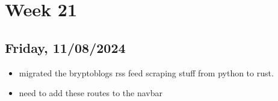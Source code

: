 \newpage
\section{Week 21}

\subsection{Friday, 11/08/2024}
\begin{itemize}
    \item migrated the bryptoblogs rss feed scraping stuff from python to rust.
    \item need to add these routes to the navbar 
\end{itemize}
